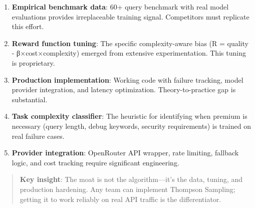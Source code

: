 \documentclass[
]{article}
\begin{document}
\begin{enumerate}
\def\labelenumi{\arabic{enumi}.}
\item
  \textbf{Empirical benchmark data}: 60+ query benchmark with real model
  evaluations provides irreplaceable training signal. Competitors must
  replicate this effort.
\item
  \textbf{Reward function tuning}: The specific complexity-aware bias (R
  = quality - β×cost×complexity) emerged from extensive experimentation.
  This tuning is proprietary.
\item
  \textbf{Production implementation}: Working code with failure
  tracking, model provider integration, and latency optimization.
  Theory-to-practice gap is substantial.
\item
  \textbf{Task complexity classifier}: The heuristic for identifying
  when premium is necessary (query length, debug keywords, security
  requirements) is trained on real failure cases.
\item
  \textbf{Provider integration}: OpenRouter API wrapper, rate limiting,
  fallback logic, and cost tracking require significant engineering.
\end{enumerate}

\begin{quote}
\textbf{Key insight}: The moat is not the algorithm---it's the data,
tuning, and production hardening. Any team can implement Thompson
Sampling; getting it to work reliably on real API traffic is the
differentiator.
\end{quote}
\end{document}
